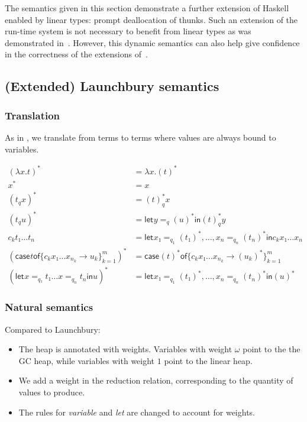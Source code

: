 \documentclass[11pt]{article}
\newcommand{\case}[3][]{\mathsf{case}_{#1} #2 \mathsf{of} \{#3\}^m_{k=1}}
\newcommand{\flet}[1][]{\mathsf{let}_{#1} }
\newcommand{\fin}{ \mathsf{in} }
\begin{document}
The semantics given in this section demonstrate a further extension of
Haskell enabled by linear types: prompt deallocation of thunks. Such
an extension of the run-time system is not necessary to benefit from
linear types as was demonstrated in~\label{sec:ghc}. However, this
dynamic semantics can also help give confidence in the correctness of
the extensions of~\label{sec:ghc}.

\subsection{(Extended) Launchbury semantics}
\label{sec:orgheadline11}

\subsubsection{Translation}
\label{sec:orgheadline9}
As in \textcite{launchbury_natural_1993}, we translate from terms to
terms where values are always bound to variables.


\begin{align*}
(λx. t)^* &= λx. (t)^* \\
x^*       &= x \\
  (t_q  x )^* &= (t)^*_q  x \\
  (t_q  u )^* &= \flet y =_{q} (u)^* \fin (t)^*_q  y \\
c_k  t₁ … t_n &= \flet x₁ =_{q_1} (t₁)^*,…, x_n =_{q_n} (t_n)^* \fin c_k x₁ … x_n \\
(\case t {c_k  x₁ … x_{n_k} → u_k})^* &= \case {(t)^*} {c_k  x₁ … x_{n_k} → (u_k)^*} \\
(\flet x =_{q₁} t₁  …  x =_{q_n} t_n \fin u)^* & = \flet x₁ =_{q_1} (t₁)^*,…, x_n =_{q_n} (t_n)^* \fin (u)^*
\end{align*}

\subsubsection{Natural semantics}
Compared to Launchbury:

\begin{itemize}
\item The heap is annotated with weights. Variables with weight $ω$
  point to the the GC heap, while variables with weight $1$ point to
  the linear heap.
\item We add a weight in the reduction relation, corresponding to the
  quantity of values to produce.
\item The rules for \emph{variable} and \emph{let} are changed to
  account for weights.
\end{itemize}
\end{document}
